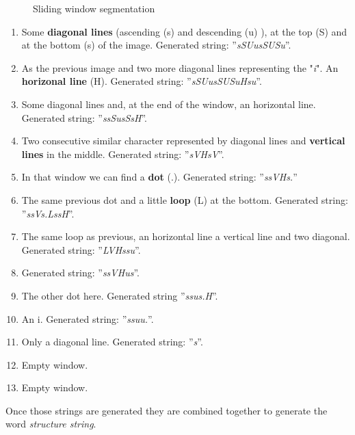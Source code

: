 \begin{figure}[!ht]
 \caption{Sliding window segmentation}
 \end{figure}

\begin{enumerate}[label=(\alph*)]
\item Some \textbf{diagonal lines} (ascending (s) and descending (u) ), at the top (S) and at the bottom (s) of the image. Generated string: ''\emph{sSUusSUSu}''.
\item As the previous image and two more diagonal lines representing the "\emph{i}". An \textbf{horizonal line} (H). Generated string: ''\emph{sSUusSUSuHsu}''.
\item Some diagonal lines and, at the end of the window, an horizontal line. Generated string: ''\emph{ssSusSsH}''.
\item Two consecutive similar character represented by diagonal lines and \textbf{vertical lines} in the middle. Generated string: ''\emph{sVHsV}''.
\item In that window we can find a \textbf{dot} (.). Generated string: ''\emph{ssVHs.}''
\item The same previous dot and a little \textbf{loop} (L) at the bottom. Generated string: ''\emph{ssVs.LssH}''.
\item The same loop as previous, an horizontal line a vertical line and two diagonal. Generated string: ''\emph{LVHssu}''.
\item Generated string: ''\emph{ssVHus}''.
\item The other dot here. Generated string ''\emph{ssus.H}''.
\item An i. Generated string: ''\emph{ssuu.}''.
\item Only a diagonal line. Generated string: ''\emph{s}''.
\item Empty window.
\item Empty window.
\end{enumerate}

Once those strings are generated they are combined together to generate the word \textit{structure string}. 